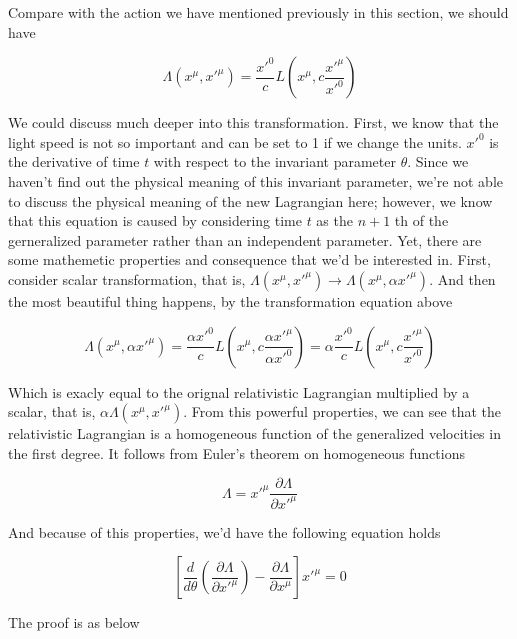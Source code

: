 \documentclass[12pt]{article}
\begin{document}
Compare with the action we have mentioned previously in this section, we should have

\begin{center}
    \[ \Lambda(x^{\mu}, x'^{\mu}) = \frac{x'^{0}}{c} L(x^{\mu}, c\frac{x'^{\mu}}{x'^{0}}) \]
\end{center}

We could discuss much deeper into this transformation. First, we know that the light speed is not so important and can be set to 1 if we change the units.
$x'^0$ is the derivative of time $t$ with respect to the invariant parameter $\theta$. Since we haven't find out the physical meaning of this invariant parameter, we're not able to discuss the physical meaning of the new Lagrangian here; however, we know that this equation is caused by considering time $t$ as the $n+1$ th of the gerneralized parameter rather than an independent parameter. Yet, there are some mathemetic properties and consequence that we'd be interested in. First, consider scalar transformation, that is, $\Lambda(x^{\mu}, x'^{\mu}) \rightarrow \Lambda(x^{\mu}, \alpha x'^{\mu})$. And then the most beautiful thing happens, by the transformation equation above

\begin{center}
    \[ \Lambda(x^{\mu}, \alpha x'^{\mu}) = \frac{\alpha x'^0}{c} L(x^{\mu}, c\frac{\alpha x'^{\mu}}{\alpha x'^0}) = \alpha \frac{x'^0}{c} L(x^{\mu}, c\frac{x'^{\mu}}{x'^0}) \]
\end{center}

Which is exacly equal to the orignal relativistic Lagrangian multiplied by a scalar, that is, $\alpha \Lambda(x^{\mu}, x'^{\mu})$. From this powerful properties, we can see that the relativistic Lagrangian is a homogeneous function of the generalized velocities in the first degree. It follows from Euler's theorem on homogeneous functions

\begin{center}
    \[ \Lambda = x'^{\mu} \frac{\partial \Lambda}{\partial x'^{\mu}} \]
\end{center}

And because of this properties, we'd have the following equation holds

\begin{center}
    \[ \left[\frac{d}{d \theta} \left( \frac{\partial \Lambda}{\partial x'^{\mu}} \right) - \frac{\partial \Lambda}{\partial x^{\mu}} \right] x'^{\mu} = 0 \]
\end{center}

The proof is as below

\begin{center}
    
\end{center}
\end{document}
